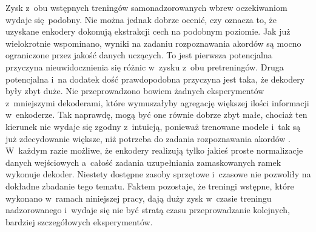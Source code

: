 Zysk z~obu wstępnych treningów samonadzorowanych wbrew oczekiwaniom wydaje się podobny. Nie można jednak dobrze ocenić, czy oznacza to, że uzyskane enkodery dokonują ekstrakcji cech na podobnym poziomie. Jak już wielokrotnie wspominano, wyniki na zadaniu rozpoznawania akordów są mocno ograniczone przez jakość danych uczących. To jest pierwsza potencjalna przyczyna nieuwidocznienia się różnic w~zysku z~obu pretreningów. Druga potencjalna i~na dodatek dość prawdopodobna przyczyna jest taka, że dekodery były zbyt duże. Nie przeprowadzono bowiem żadnych eksperymentów z~mniejszymi dekoderami, które wymuszałyby agregację większej ilości informacji w~enkoderze. Tak naprawdę, mogą być one równie dobrze zbyt małe, chociaż ten kierunek nie wydaje się zgodny z~intuicją, ponieważ trenowane modele i~tak są już zdecydowanie większe, niż potrzeba do zadania rozpoznawania akordów \cite{ohanlon_fifthnet_2021}. W~każdym razie możliwe, że enkodery realizują tylko jakieś proste normalizacje danych wejściowych a~całość zadania uzupełniania zamaskowanych ramek wykonuje dekoder. Niestety dostępne zasoby sprzętowe i~czasowe nie pozwoliły na dokładne zbadanie tego tematu. Faktem pozostaje, że treningi wstępne, które wykonano w~ramach niniejszej pracy, dają duży zysk w~czasie treningu nadzorowanego i~wydaje się nie być stratą czasu przeprowadzanie kolejnych, bardziej szczegółowych eksperymentów.

